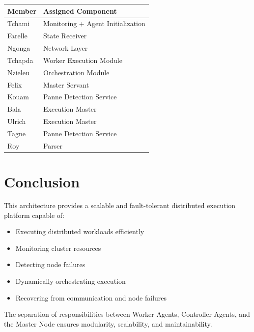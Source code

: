 \documentclass[12pt,a4paper]{article}
\begin{document}
\begin{longtable}{|p{5cm}|p{8cm}|}
\hline
\textbf{Member} & \textbf{Assigned Component} \\
\hline
Tchami & Monitoring + Agent Initialization \\
\hline
Farelle & State Receiver \\
\hline
Ngonga & Network Layer \\
\hline
Tchapda & Worker Execution Module \\
\hline
Nzieleu & Orchestration Module \\
\hline
Felix & Master Servant \\
\hline
Kouam & Panne Detection Service \\
\hline
Bala & Execution Master \\
\hline
Ulrich & Execution Master \\
\hline
Tagne & Panne Detection Service \\
\hline
Roy & Parser \\
\hline
\end{longtable}

\section{Conclusion}

This architecture provides a scalable and fault-tolerant distributed execution platform capable of:

\begin{itemize}
    \item Executing distributed workloads efficiently
    \item Monitoring cluster resources
    \item Detecting node failures
    \item Dynamically orchestrating execution
    \item Recovering from communication and node failures
\end{itemize}

The separation of responsibilities between Worker Agents, Controller Agents, and the Master Node ensures modularity, scalability, and maintainability.
\end{document}
